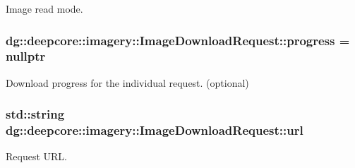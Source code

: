 Image read mode. 

\subsubsection[{\texorpdfstring{progress}{progress}}]{ dg\+::deepcore\+::imagery\+::\+Image\+Download\+Request\+::progress = nullptr}\hypertarget{structdg_1_1deepcore_1_1imagery_1_1_image_download_request_a4f57be7a58f4c062ab20e0b44632bb2c}{}\label{structdg_1_1deepcore_1_1imagery_1_1_image_download_request_a4f57be7a58f4c062ab20e0b44632bb2c}


Download progress for the individual request. (optional) 

\subsubsection[{\texorpdfstring{url}{url}}]{\setlength{\rightskip}{0pt plus 5cm}std\+::string dg\+::deepcore\+::imagery\+::\+Image\+Download\+Request\+::url}\hypertarget{structdg_1_1deepcore_1_1imagery_1_1_image_download_request_a5080adfbdc1224d479c6f1818c832608}{}\label{structdg_1_1deepcore_1_1imagery_1_1_image_download_request_a5080adfbdc1224d479c6f1818c832608}


Request U\+RL. 

